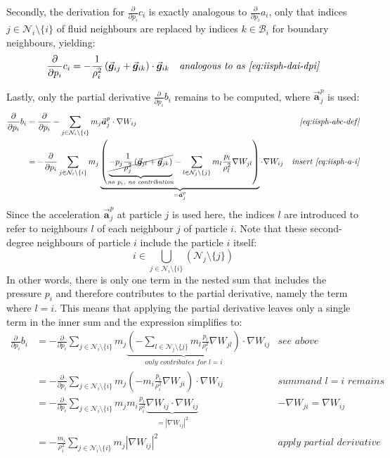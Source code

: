 \documentclass[oneside, a4paper]{book}
\newcommand\abs[1]{\left|#1\right|}
\newcommand\pdpi[0]{\frac{\partial}{\partial p_i}}
\newcommand\vek[1]{\vec{\bm{#1}}}
\newcommand\br[1]{\left(#1\right)}
\begin{document}
    Secondly, the derivation for $\pdpi c_i$ is exactly analogous to $\pdpi  a_i$, only that indices $j\in\mathcal{N}_i\setminus \{i\}$ of fluid neighbours are replaced by indices $k\in\mathcal{B}_i$ for boundary neighbours, yielding:
    \begin{align}
      \pdpi c_i &= -\frac{1}{\rho_i^2} \br{\vek{g}_{ij} +\vek{g}_{ik}} \cdot \vek{g}_{ik} &\textit{analogous to as \autoref{eq:iisph-dai-dpi}}\label{eq:iisph-dci-dpi}
    \end{align}

    Lastly, only the partial derivative $\pdpi b_i$ remains to be computed, where $\vek{a}_j^p$ is used:
    \begin{align*}
      \pdpi b_i &=
      \pdpi - \sum_{j\in\mathcal{N}_i\setminus \{i\}} m_j \vek{a}^p_{j} \cdot \nabla W_{ij} &\textit{\autoref{eq:iisph-abc-def}}\\
      &= -\pdpi \sum_{j\in\mathcal{N}_i\setminus \{i\}} m_j 
      \underbrace{\br{
        \underbrace{\cancel{-p_j \frac{1}{\rho_j^2}\br{
          \vek{g}_{jl}
          +\vek{g}_{jk}
        }}}_{\textit{no $p_i$, no contribution}}
        - \sum_{l\in\mathcal{N}_j\setminus \{j\}} 
        m_l\frac{p_l}{\rho_l^2} \nabla W_{jl} 
      }}_{=\vek{a}_j^p} \cdot \nabla W_{ij} &\textit{insert \autoref{eq:iisph-a-i}}
    \end{align*}
    Since the acceleration $\vek{a}_j^p$ at particle $j$ is used here, the indices $l$ are introduced to refer to neighbours $l$ of each neighbour $j$ of particle $i$. Note that these second-degree neighbours of particle $i$ include the particle $i$ itself:
    \begin{equation}
      i \in \bigcup_{j\in\mathcal{N}_i\setminus\{i\}}\br{\mathcal{N}_j \setminus \{j\}  }
    \end{equation} 
    In other words, there is only one term in the nested sum that includes the pressure $p_i$ and therefore contributes to the partial derivative, namely the term where $l=i$. This means that applying the partial derivative leaves only a single term in the inner sum and the expression simplifies to:
    \begin{align}
      \pdpi b_i &= -\pdpi \sum_{j\in\mathcal{N}_i\setminus \{i\}} m_j \underbrace{\br{
        - \sum_{l\in\mathcal{N}_j\setminus \{j\}} 
        m_l\frac{p_l}{\rho_l^2} \nabla W_{jl} 
      }}_{\textit{only contributes for $l=i$}} \cdot \nabla W_{ij} &\textit{see above}\\
      &= -\pdpi \sum_{j\in\mathcal{N}_i\setminus \{i\}} m_j \br{
        - m_i\frac{p_i}{\rho_i^2} \nabla W_{ji} 
      } \cdot \nabla W_{ij} 
      &\textit{summand $l=i$ remains}\\
      &=- \pdpi \sum_{j\in\mathcal{N}_i\setminus \{i\}} m_j m_i 
        \frac{p_i}{\rho_i^2} 
        \underbrace{\nabla W_{ij} \cdot \nabla W_{ij}}_{=\abs{\nabla W_{ij}}^2}
         &\textit{$-\nabla W_{ji}=\nabla W_{ij}$}\\
      &= -\frac{m_i}{\rho_i^2} \sum_{j\in\mathcal{N}_i\setminus \{i\}} m_j  \abs{\nabla W_{ij}}^2 &\textit{apply partial derivative}
    \end{align}
\end{document}
